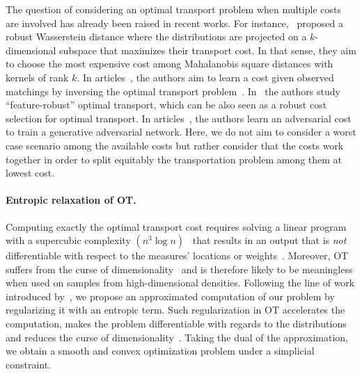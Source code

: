 The question of considering an optimal transport problem when multiple costs are involved has already been raised in recent works. For instance,~\citep{paty2019subspace} proposed a robust Wasserstein distance where the distributions are projected on a $k$-dimensional subspace that maximizes their transport cost. In that sense, they aim to choose the most expensive cost among Mahalanobis square distances with kernels of rank $k$. In articles~\citep{li2019learning,sun2020learning}, the authors aim to learn a cost given observed matchings by inversing the optimal transport problem~\citep{dupuy2016estimating}. In~\citep{petrovich2020feature} the authors study ``feature-robust'' optimal transport, which can be also seen as a robust cost selection for optimal transport. In articles~\citep{genevay2017learning,scetbon2020linear}, the authors learn an adversarial cost to train a generative adversarial network. Here, we do not aim to consider a worst case scenario among the available costs but rather consider that the costs work together in order to split equitably the transportation problem among them at lowest cost.

\paragraph{Entropic relaxation of OT.} Computing exactly the optimal transport cost requires solving a linear program with a supercubic complexity $(n^3 \log n)$~\citep{Tarjan1997} that results in an output that is \textit{not} differentiable with respect to the measures' locations or weights~\citep{bertsimas1997introduction}. Moreover, OT suffers from the curse of dimensionality~\citep{dudley1969speed,fournier2015rate} and is therefore likely to be meaningless when used on samples from high-dimensional densities. Following the line of work introduced by~\cite{cuturi2013sinkhorn}, we propose an approximated computation of our problem by regularizing it with an entropic term. Such regularization in OT accelerates the computation, makes the problem differentiable with regards to the distributions~\citep{feydy2018interpolating} and reduces the curse of dimensionality~\citep{genevay2018sample}. Taking the dual of the approximation, we obtain a smooth and convex optimization problem under a simplicial constraint.

